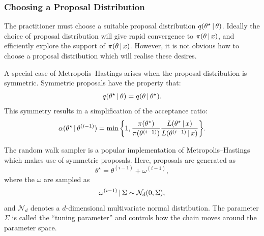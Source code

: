 \subsubsection{Choosing a Proposal Distribution}
\label{ssec:proposal_distribution}

The practitioner must choose a suitable proposal distribution $q(\theta^\star
\,|\, \theta)$. Ideally the choice of proposal distribution will give rapid
convergence to $\pi(\theta \,|\, x)$, and efficiently explore the support of
$\pi(\theta \,|\, x)$. However, it is not obvious how to choose a proposal
distribution which will realise these desires.

A special case of Metropolis--Hastings arises when the proposal distribution is
symmetric. Symmetric proposals have the property that:
\begin{equation*}
  q(\theta^\star \,|\, \theta) = q(\theta \,|\, \theta^\star).
\end{equation*}
This symmetry results in a simplification of the acceptance ratio:
\begin{equation*}
  \alpha({\theta}^\star \given \theta^{(i-1)})
    = \text{min}\,\bigg\{1,
                        \frac{\pi(\theta^\star)}{\pi(\theta^{(i-1)})}%
                        \frac{L(\theta^\star \given  x)}%
                        {L(\theta^{(i-1)} \given  x)}
                  \bigg\}.
\end{equation*}

The random walk sampler is a popular implementation of Metropolis--Hastings
which makes use of symmetric proposals. Here, proposals are generated as
\begin{equation*}
  \theta^\star = \theta^{(i-1)} +  \omega^{(i-1)},
\end{equation*}
where the $\omega$ are sampled as
\begin{equation*}
   \omega^{(i-1)} \,|\, \Sigma \sim \mathcal{N}_d(0, \Sigma),
\end{equation*}
and $\mathcal{N}_d$ denotes a $d$-dimensional multivariate normal distribution.
The parameter $\Sigma$ is called the ``tuning parameter'' and controls how the
chain moves around the parameter space.

